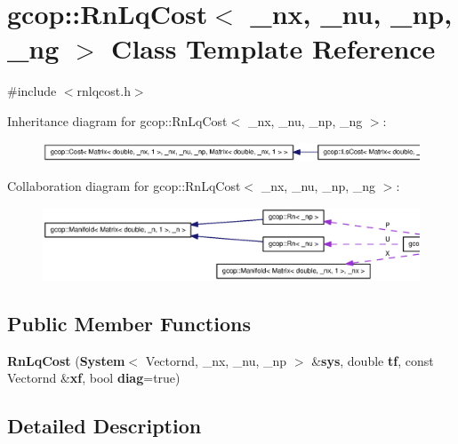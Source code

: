 \section{gcop\-:\-:\-Rn\-Lq\-Cost$<$ \-\_\-nx, \-\_\-nu, \-\_\-np, \-\_\-ng $>$ \-Class \-Template \-Reference}
\label{classgcop_1_1RnLqCost}


{\ttfamily \#include $<$rnlqcost.\-h$>$}



\-Inheritance diagram for gcop\-:\-:\-Rn\-Lq\-Cost$<$ \-\_\-nx, \-\_\-nu, \-\_\-np, \-\_\-ng $>$\-:
\nopagebreak
\begin{figure}[H]
\begin{center}
\leavevmode
\includegraphics[width=350pt]{classgcop_1_1RnLqCost__inherit__graph}
\end{center}
\end{figure}


\-Collaboration diagram for gcop\-:\-:\-Rn\-Lq\-Cost$<$ \-\_\-nx, \-\_\-nu, \-\_\-np, \-\_\-ng $>$\-:
\nopagebreak
\begin{figure}[H]
\begin{center}
\leavevmode
\includegraphics[width=350pt]{classgcop_1_1RnLqCost__coll__graph}
\end{center}
\end{figure}
\subsection*{\-Public \-Member \-Functions}
\begin{DoxyCompactItemize}
\item 
{\bf \-Rn\-Lq\-Cost} ({\bf \-System}$<$ \-Vectornd, \-\_\-nx, \-\_\-nu, \-\_\-np $>$ \&{\bf sys}, double {\bf tf}, const \-Vectornd \&{\bf xf}, bool {\bf diag}=true)
\end{DoxyCompactItemize}


\subsection{\-Detailed \-Description}
